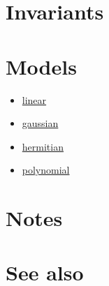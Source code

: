 \documentclass{article}
\begin{document}
\section*{Invariants}

\section*{Models}

\begin{itemize}
\item \href{\kmlroot/linear.html}{linear}
\item \href{\kmlroot/gaussian.html}{gaussian}
\item \href{\kmlroot/hermitian.html}{hermitian}
\item \href{\kmlroot/polynomial.html}{polynomial}
\end{itemize}

\section*{Notes}


\section*{See also}




\end{document}
